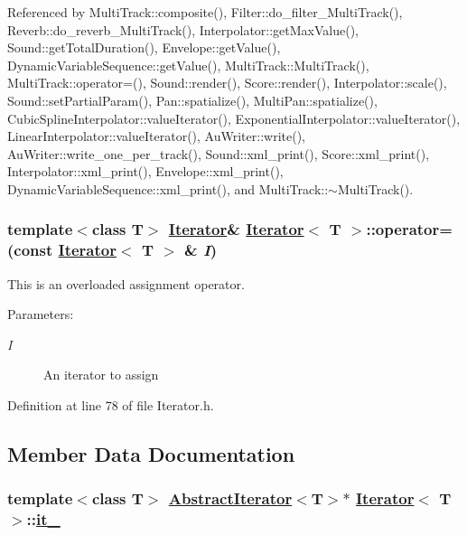 Referenced by Multi\-Track::composite(), Filter::do\_\-filter\_\-Multi\-Track(), Reverb::do\_\-reverb\_\-Multi\-Track(), Interpolator::get\-Max\-Value(), Sound::get\-Total\-Duration(), Envelope::get\-Value(), Dynamic\-Variable\-Sequence::get\-Value(), Multi\-Track::Multi\-Track(), Multi\-Track::operator=(), Sound::render(), Score::render(), Interpolator::scale(), Sound::set\-Partial\-Param(), Pan::spatialize(), Multi\-Pan::spatialize(), Cubic\-Spline\-Interpolator::value\-Iterator(), Exponential\-Interpolator::value\-Iterator(), Linear\-Interpolator::value\-Iterator(), Au\-Writer::write(), Au\-Writer::write\_\-one\_\-per\_\-track(), Sound::xml\_\-print(), Score::xml\_\-print(), Interpolator::xml\_\-print(), Envelope::xml\_\-print(), Dynamic\-Variable\-Sequence::xml\_\-print(), and Multi\-Track::$\sim$Multi\-Track().\hypertarget{classIterator_a3}{
\subsubsection[operator=]{\setlength{\rightskip}{0pt plus 5cm}template$<$class T$>$ \hyperlink{classIterator}{Iterator}\& \hyperlink{classIterator}{Iterator}$<$ T $>$::operator= (const \hyperlink{classIterator}{Iterator}$<$ T $>$ \& {\em I})}}
\label{classIterator_a3}


This is an overloaded assignment operator. \begin{Desc}
\item[Parameters:]
\begin{description}
\item[{\em I}]An iterator to assign \end{description}
\end{Desc}


Definition at line 78 of file Iterator.h.

\subsection{Member Data Documentation}
\hypertarget{classIterator_r0}{
\subsubsection[it\_\-]{\setlength{\rightskip}{0pt plus 5cm}template$<$class T$>$ \hyperlink{classAbstractIterator}{Abstract\-Iterator}$<$T$>$$\ast$ \hyperlink{classIterator}{Iterator}$<$ T $>$::\hyperlink{classIterator_r0}{it\_\-}}}
\label{classIterator_r0}




